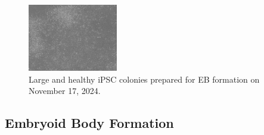 \documentclass[11pt]{article}
\begin{document}
\begin{figure}[H]
    \centering
    \includegraphics[width=0.35\textwidth]{1_Sandra_1711.jpeg}
    \caption{Large and healthy iPSC colonies prepared for EB formation on November 17, 2024.}
    \label{fig:1_Sandra_1711}
\end{figure}

\subsection{Embryoid Body Formation}
\end{document}
